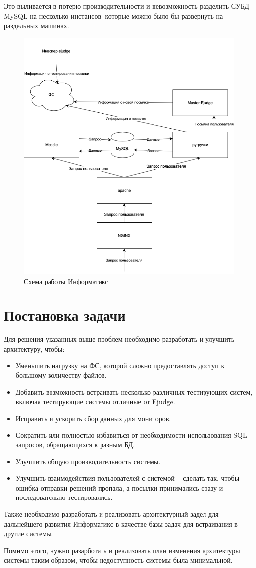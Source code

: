 
Это выливается в потерю производительности и невозможность разделить СУБД MySQL на несколько инстансов, 
которые можно было бы развернуть на раздельных машинах.

\begin{figure}
  \centering
  \includegraphics[width=\textwidth]{figures/old_informatics.png}
  \caption{Схема работы Информатикс}
  \label{fig:old_informatics}
\end{figure}

\section{Постановка задачи}

Для решения указанных выше проблем необходимо разработать и улучшить архитектуру, чтобы:

\begin{itemize}
    \item Уменьшить нагрузку на ФС, которой сложно предоставлять доступ к большому количеству файлов.
    \item Добавить возможность встраивать несколько различных тестирующих систем, включая тестирующие системы отличные от Ejudge.
    \item Исправить и ускорить сбор данных для мониторов.
    \item Сократить или полностью избавиться от необходимости использования SQL-запросов, обращающихся к разным БД.
    \item Улучшить общую производительность системы.
    \item Улучшить взаимодействия пользователей с системой 
    -- сделать так, чтобы ошибка отправки решений пропала,
    а посылки принимались сразу и последовательно тестировались.
\end{itemize}

Также необходимо разработать и реализовать архитектурный задел для дальнейшего развития Информатикс в качестве базы задач для встраивания в другие системы.

Помимо этого, нужно разарботать и реализовать план изменения архитектуры системы таким образом, чтобы недоступность системы была минимальной.